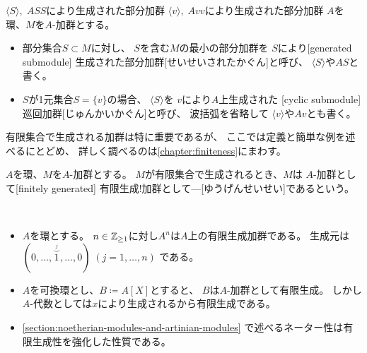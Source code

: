\documentclass[report]{jlreq}
\begin{document}

\begin{definition}[部分集合により生成された加群]
        {$\langle S \rangle, \; AS$}{$S$により生成された部分加群}
        {$\langle v \rangle, \; Av$}{$v$により生成された部分加群}
    $A$を環、$M$を$A$-加群とする。
    \begin{itemize}
        \item 部分集合$S \subset M$に対し、
            $S$を含む$M$の最小の部分加群を
            $S$により[generated submodule]
            {生成された部分加群}[せいせいされたかぐん]と呼び、
            $\langle S \rangle$や$AS$と書く。
        \item $S$が1元集合$S = \{ v \}$の場合、
            $\langle S \rangle$を
            $v$により$A$上生成された
            [cyclic submodule]{巡回加群}[じゅんかいかぐん]と呼び、
            波括弧を省略して
            $\langle v \rangle$や$Av$とも書く。
    \end{itemize}
\end{definition}

有限集合で生成される加群は特に重要であるが、
ここでは定義と簡単な例を述べるにとどめ、
詳しく調べるのは\cref{chapter:finiteness}にまわす。

\begin{definition}[有限生成加群]
    $A$を環、$M$を$A$-加群とする。
    $M$が有限集合で生成されるとき、$M$は
    $A$-加群として[finitely generated]
    {有限生成!加群として---}[ゆうげんせいせい]であるという。
\end{definition}

\begin{example}[有限生成加群とそうでない加群の例]
    ~
    \begin{itemize}
        \item $A$を環とする。
            $n \in \mathbb{Z}_{\ge 1}$に対し$A^n$は$A$上の有限生成加群である。
            生成元は$(0, \dots, \overset{\stackrel{j}{\smile}}{1}, \dots, 0)
                \; (j = 1, \dots, n)$
            である。
        \item $A$を可換環とし、$B \coloneqq A[X]$とすると、
            $B$は$A$-加群として有限生成。
            しかし$A$-代数としては$x$により生成されるから有限生成である。
        \item \cref{section:noetherian-modules-and-artinian-modules}
            で述べるネーター性は有限生成性を強化した性質である。
    \end{itemize}
\end{example}
\end{document}
